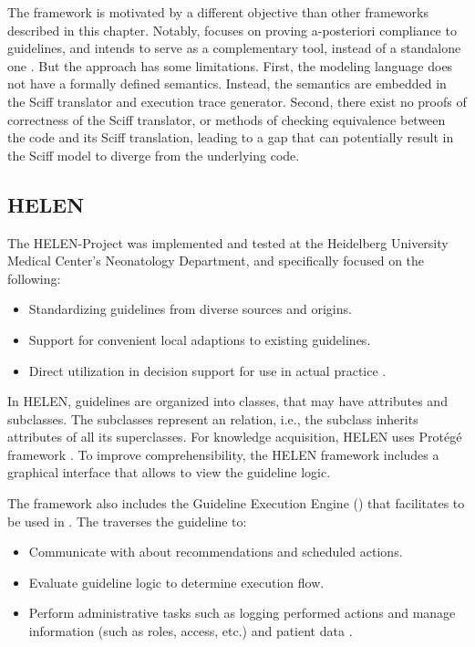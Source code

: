 The \GPROVE{} framework is motivated by a different objective than other
frameworks described in this chapter. Notably, \GPROVE{} focuses on proving
a-posteriori compliance to guidelines, and intends to serve as a complementary
tool, instead of a standalone one \cite{BottrighiBook10}. But the
approach has some limitations.
First, the \GPROVE{} modeling language does not have a formally defined
semantics. Instead, the semantics are embedded in the Sciff translator and
execution trace generator. Second, there exist no proofs of correctness of
the Sciff translator, or methods of checking equivalence between the
\GOSPEL{} code and its Sciff translation, leading to a gap that can
potentially result in the Sciff model to diverge from the underlying \GOSPEL{}
code.

\subsection{HELEN}\label{sec:helen}

The HELEN-Project was implemented and tested at
the Heidelberg University Medical Center's Neonatology Department,
and specifically focused on the following:
\begin{itemize}
  \item Standardizing guidelines from diverse sources and origins.
  \item Support for convenient local adaptions to existing guidelines.
  \item Direct utilization in decision support for use in actual practice \cite{SkonetzkiMIM04}.
\end{itemize}

In HELEN, guidelines are organized into classes, that may have attributes and
subclasses. The subclasses represent an  relation, i.e., the subclass
inherits attributes of all its superclasses.
For knowledge acquisition, HELEN uses Prot\'eg\'e framework \cite{GennariIJHS03}.
To improve comprehensibility, the HELEN framework includes a graphical interface
that allows \HCPs{} to view the guideline logic.

The framework also includes the Guideline Execution Engine (\GEE{}) that
facilitates \BPGs{} to be used in \CDSSs{}. The \GEE{} traverses the guideline
to:
\begin{itemize}
  \item Communicate with \HCPs{} about recommendations and scheduled actions.
  \item Evaluate guideline logic to determine execution flow.
  \item Perform administrative tasks such as logging performed actions and
    manage \HCP{} information (such as roles, access, etc.) and patient data
    \cite{SkonetzkiMIM04}.
\end{itemize}

